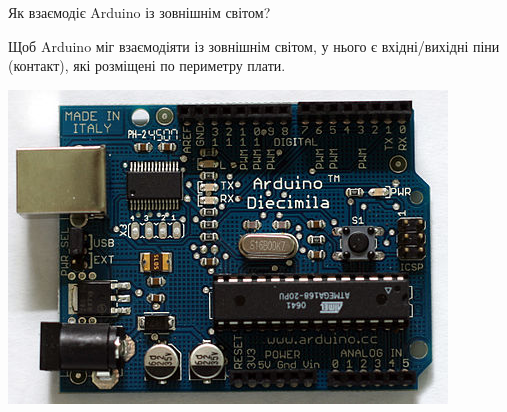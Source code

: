 \documentclass[9pt]{beamer}
\begin{document}
\begin{frame}{Як взаємодіє Arduino із зовнішнім світом?}{}
     \begin{block}{}
     Щоб Arduino міг взаємодіяти із зовнішнім світом, у нього є вхідні/вихідні піни (контакт), які розміщені по периметру плати.
     \end{block}

            \begin{center}
                \includegraphics[width=0.5\linewidth]{pictures/arduino}
            \end{center}
\end{frame}
\end{document}
